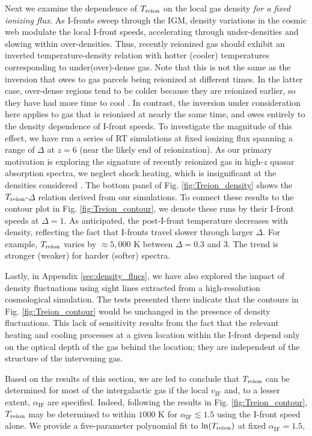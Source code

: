 \documentclass[twocolumn]{aastex62}
\newcommand{\Treion}{T_{\rm reion}}
\newcommand{\vIF}{v_{\mathrm{IF}}}
\newcommand{\spec}{\alpha_{\mathrm{IF}}}
\begin{document}
Next we examine the dependence of $\Treion$ on the local gas density {\it for a fixed ionizing flux}.  As I-fronts sweep through the IGM, density variations in the cosmic web modulate the local I-front speeds, accelerating through under-densities and slowing within over-densities. Thus, recently reionized gas should exhibit an inverted temperature-density relation with hotter (cooler) temperatures corresponding to under(over)-dense gas.  Note that this is not the same as the inversion that owes to gas parcels being reionized at different times.  In the latter case, over-dense regions tend to be colder because they are reionized earlier, so they have had more time to cool \citep[see e.g.][]{2008ApJ...689L..81T, 2009ApJ...701...94F}.  In contrast, the inversion under consideration here applies to gas that is reionized at nearly the same time, and owes entirely to the density dependence of I-front speeds. To investigate the magnitude of this effect, we have run a series of RT simulations at fixed ionizing flux spanning a range of $\Delta$ at $z=6$ (near the likely end of reionization). As our primary motivation is exploring the signature of recently reionized gas in high-$z$ quasar absorption spectra, we neglect shock heating, which is insignificant at the densities considered \citep{2016MNRAS.456...47M}.  The bottom panel of Fig. \ref{fig:Treion_density} shows the $\Treion$-$\Delta$ relation derived from our simulations.  To connect these results to the contour plot in Fig. \ref{fig:Treion_contour}, we denote these runs by their I-front speeds at $\Delta = 1$.  As anticipated, the post-I-front temperature decreases with density, reflecting the fact that I-fronts travel slower through larger $\Delta$.  For example, $\Treion$ varies by $\approx 5,000$ K between $\Delta = 0.3$ and $3$.  The trend is stronger (weaker) for harder (softer) spectra.     

{ Lastly, in Appendix \ref{sec:density_flucs}, we have also explored the impact of density fluctuations using sight lines extracted from a high-resolution cosmological simulation.  The tests presented there indicate that the contours in Fig. \ref{fig:Treion_contour} would be unchanged in the presence of density fluctuations.  This lack of sensitivity results from the fact that the relevant heating and cooling processes at a given location within the I-front depend only on the optical depth of the gas behind the location; they are independent of the structure of the intervening gas.   } 

Based on the results of this section, we are led to conclude that $\Treion$ can be determined for most of the intergalactic gas if the local $\vIF$ and, to a lesser extent, $\spec$ are specified.  Indeed, following the results in Fig. \ref{fig:Treion_contour}, $\Treion$ may be determined to within $1000$ K for $\spec \lesssim 1.5$ using the I-front speed alone.  We provide a five-parameter polynomial fit to $\ln(\Treion)$ at fixed $\spec =1.5$, 
\end{document}
